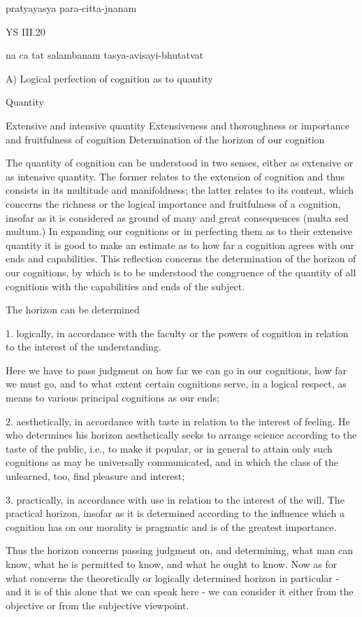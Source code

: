     pratyayasya para-citta-jnanam

YS III.20

    na ca tat salambanam tasya-avisayi-bhutatvat

A) Logical perfection of cognition as to quantity

Quantity

    Extensive and intensive quantity
    Extensiveness and thoroughness or importance and fruitfulness of cognition
    Determination of the horizon of our cognition

The quantity of cognition can be understood in two senses,
either as extensive or as intensive quantity.
The former relates to the extension of cognition and
thus consists in its multitude and manifoldness;
the latter relates to its content, which concerns the richness
or the logical importance and fruitfulness of a cognition,
insofar as it is considered as ground of many and great consequences (multa sed multum.)
In expanding our cognitions or in perfecting them as to their extensive quantity
it is good to make an estimate as to how far a cognition agrees with our ends and capabilities.
This reflection concerns the determination of the horizon of our cognitions,
by which is to be understood the congruence of the quantity of all cognitions
with the capabilities and ends of the subject.

The horizon can be determined

1. logically, in accordance with the faculty or the powers of cognition
in relation to the interest of the understanding.

Here we have to pass judgment on how far we can go in our cognitions,
how far we must go, and to what extent certain cognitions serve,
in a logical respect, as means to various principal cognitions as our ends;

2. aesthetically, in accordance with taste in relation to the interest of feeling.
He who determines his horizon aesthetically seeks to arrange science according
to the taste of the public, i.e., to make it popular, or in general to attain only
such cognitions as may be universally communicated, and in which the class
of the unlearned, too, find pleasure and interest;

3. practically, in accordance with use in relation to the interest of the will.
The practical horizon, insofar as it is determined according to the influence
which a cognition has on our morality is pragmatic and is of the greatest importance.

Thus the horizon concerns passing judgment on, and determining,
what man can know, what he is permitted to know, and what he ought to know.
Now as for what concerns the theoretically or logically determined horizon
in particular - and it is of this alone that we can speak here - we can
consider it either from the objective or from the subjective viewpoint.


